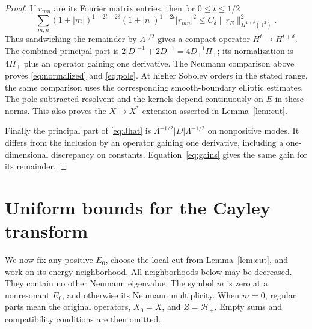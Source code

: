 \documentclass[11pt]{amsart}
\numberwithin{equation}{section}
\newcommand{\T}{\mathbb T}
\newcommand{\norm}[1]{\lVert #1\rVert}
\begin{document}
\begin{proof}
If $r_{mn}$ are its Fourier matrix entries, then for $0\le t\le1/2$
\[
 \sum_{m,n}(1+|m|)^{1+2t+2\delta}(1+|n|)^{1-2t}|r_{mn}|^2
       \le C_\delta\norm{r_E}_{H^{1+\delta}(\T^2)}^2.
\]
Thus sandwiching the remainder by $\Lambda^{1/2}$ gives a compact
operator $H^t\to H^{t+\delta}$. The combined principal part is
$2|D|^{-1}+2D^{-1}=4D_+^{-1}\Pi_+$; its normalization is $4\Pi_+$ plus
an operator gaining one derivative. The Neumann comparison above proves
\eqref{eq:normalized} and \eqref{eq:pole}. At higher Sobolev orders
in the stated range, the same comparison uses the corresponding
smooth-boundary elliptic estimates. The pole-subtracted resolvent
and the kernels depend continuously on $E$ in these norms. This also proves the
$X\to X^*$ extension asserted in Lemma~\ref{lem:cut}.

Finally the principal part of \eqref{eq:Jhat} is
$\Lambda^{-1/2}|D|\Lambda^{-1/2}$ on nonpositive modes. It differs from
the inclusion by an operator gaining one derivative, including a
one-dimensional discrepancy on constants. Equation~\eqref{eq:gains}
gives the same gain for its remainder.
\end{proof}

\section{Uniform bounds for the Cayley transform}\label{sec:uniform}

We now fix any positive $E_0$, choose the local cut from
Lemma~\ref{lem:cut}, and work on its energy neighborhood. All neighborhoods
below may be decreased. They contain no other Neumann eigenvalue.
The symbol $m$ is zero at a nonresonant $E_0$, and otherwise its Neumann
multiplicity. When $m=0$, regular parts mean the original operators,
$X_0=X$, and $Z=\mathcal H_+$. Empty sums and compatibility
conditions are then omitted.
\end{document}
